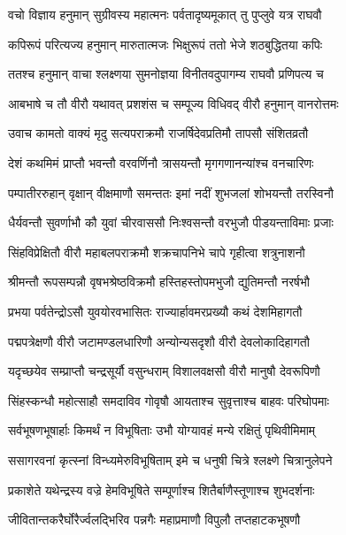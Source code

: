 
\twolineshloka
{वचो विज्ञाय हनुमान् सुग्रीवस्य महात्मनः}
{पर्वतादृष्यमूकात् तु पुप्लुवे यत्र राघवौ} %

\twolineshloka
{कपिरूपं परित्यज्य हनुमान् मारुतात्मजः}
{भिक्षुरूपं ततो भेजे शठबुद्धितया कपिः} %

\twolineshloka
{ततश्च हनुमान् वाचा श्लक्ष्णया सुमनोज्ञया}
{विनीतवदुपागम्य राघवौ प्रणिपत्य च} %

\twolineshloka
{आबभाषे च तौ वीरौ यथावत् प्रशशंस च}
{सम्पूज्य विधिवद् वीरौ हनुमान् वानरोत्तमः} %

\twolineshloka
{उवाच कामतो वाक्यं मृदु सत्यपराक्रमौ}
{राजर्षिदेवप्रतिमौ तापसौ संशितव्रतौ} %

\twolineshloka
{देशं कथमिमं प्राप्तौ भवन्तौ वरवर्णिनौ}
{त्रासयन्तौ मृगगणानन्यांश्च वनचारिणः} %

\twolineshloka
{पम्पातीररुहान् वृक्षान् वीक्षमाणौ समन्ततः}
{इमां नदीं शुभजलां शोभयन्तौ तरस्विनौ} %

\twolineshloka
{धैर्यवन्तौ सुवर्णाभौ कौ युवां चीरवाससौ}
{निःश्वसन्तौ वरभुजौ पीडयन्ताविमाः प्रजाः} %

\twolineshloka
{सिंहविप्रेक्षितौ वीरौ महाबलपराक्रमौ}
{शक्रचापनिभे चापे गृहीत्वा शत्रुनाशनौ} %

\twolineshloka
{श्रीमन्तौ रूपसम्पन्नौ वृषभश्रेष्ठविक्रमौ}
{हस्तिहस्तोपमभुजौ द्युतिमन्तौ नरर्षभौ} %

\twolineshloka
{प्रभया पर्वतेन्द्रोऽसौ युवयोरवभासितः}
{राज्यार्हावमरप्रख्यौ कथं देशमिहागतौ} %

\twolineshloka
{पद्मपत्रेक्षणौ वीरौ जटामण्डलधारिणौ}
{अन्योन्यसदृशौ वीरौ देवलोकादिहागतौ} %

\twolineshloka
{यदृच्छयेव सम्प्राप्तौ चन्द्रसूर्यौ वसुन्धराम्}
{विशालवक्षसौ वीरौ मानुषौ देवरूपिणौ} %

\twolineshloka
{सिंहस्कन्धौ महोत्साहौ समदाविव गोवृषौ}
{आयताश्च सुवृत्ताश्च बाहवः परिघोपमाः} %

\twolineshloka
{सर्वभूषणभूषार्हाः किमर्थं न विभूषिताः}
{उभौ योग्यावहं मन्ये रक्षितुं पृथिवीमिमाम्} %

\twolineshloka
{ससागरवनां कृत्स्नां विन्ध्यमेरुविभूषिताम्}
{इमे च धनुषी चित्रे श्लक्ष्णे चित्रानुलेपने} %

\twolineshloka
{प्रकाशेते यथेन्द्रस्य वज्रे हेमविभूषिते}
{सम्पूर्णाश्च शितैर्बाणैस्तूणाश्च शुभदर्शनाः} %

\twolineshloka
{जीवितान्तकरैर्घोरैर्ज्वलद्भिरिव पन्नगैः}
{महाप्रमाणौ विपुलौ तप्तहाटकभूषणौ} %

